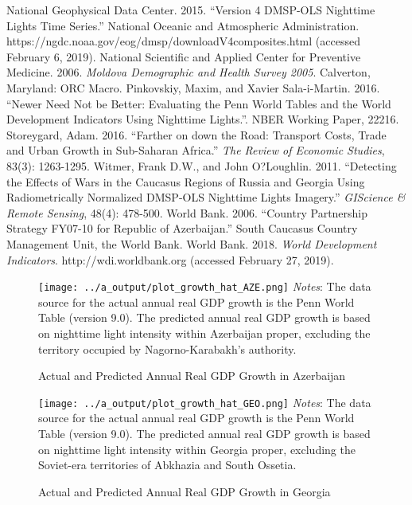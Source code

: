 \documentclass[12pt,a4paper]{article}%
\begin{document}
\begin{thebibliography}{99}
\bibitem{} National Geophysical Data Center. 2015. ``Version 4 DMSP-OLS Nighttime Lights Time Series.'' National Oceanic and Atmospheric Administration. https://ngdc.noaa.gov/eog/dmsp/downloadV4composites.html (accessed February 6, 2019).
\bibitem{} National Scientific and Applied Center for Preventive Medicine. 2006. \textit{Moldova Demographic and Health Survey 2005}. Calverton, Maryland: ORC Macro.
\bibitem{} Pinkovskiy, Maxim, and Xavier Sala-i-Martin. 2016. ``Newer Need Not be Better: Evaluating the Penn World Tables and the World Development Indicators Using Nighttime Lights.''. NBER Working Paper, 22216.
\bibitem{} Storeygard, Adam. 2016. ``Farther on down the Road: Transport Costs, Trade and Urban Growth in Sub-Saharan Africa.'' \textit{The Review of Economic Studies}, 83(3): 1263-1295.
\bibitem{} Witmer, Frank D.W., and John O?Loughlin. 2011. ``Detecting the Effects of Wars in the Caucasus Regions of Russia and Georgia Using Radiometrically Normalized DMSP-OLS Nighttime Lights Imagery.'' \textit{GIScience \& Remote Sensing}, 48(4): 478-500.
\bibitem{} World Bank. 2006. ``Country Partnership Strategy FY07-10 for Republic of Azerbaijan.'' South Caucasus Country Management Unit, the World Bank.
\bibitem{} World Bank. 2018. \textit{World Development Indicators}. http://wdi.worldbank.org (accessed February 27, 2019).
\end{thebibliography}

\begin{figure}[ptb]
\caption{Actual and Predicted Annual Real GDP Growth in Azerbaijan}%
\label{aze}%
\texttt{[image: ../a\_output/plot\_growth\_hat\_AZE.png]}
{\scriptsize \textit{Notes}: 
	The data source for the actual annual real GDP growth is the Penn World Table (version 9.0). 
	The predicted annual real GDP growth is based on nighttime light intensity within Azerbaijan proper, excluding the territory occupied by Nagorno-Karabakh's authority. 
}
\end{figure}

\begin{figure}[ptb]
\caption{Actual and Predicted Annual Real GDP Growth in Georgia}%
\label{geo}%
\texttt{[image: ../a\_output/plot\_growth\_hat\_GEO.png]}
{\scriptsize \textit{Notes}: 
	The data source for the actual annual real GDP growth is the Penn World Table (version 9.0). 
	The predicted annual real GDP growth is based on nighttime light intensity within Georgia proper, excluding the Soviet-era territories of Abkhazia and South Ossetia. 
}
\end{figure}
\end{document}
